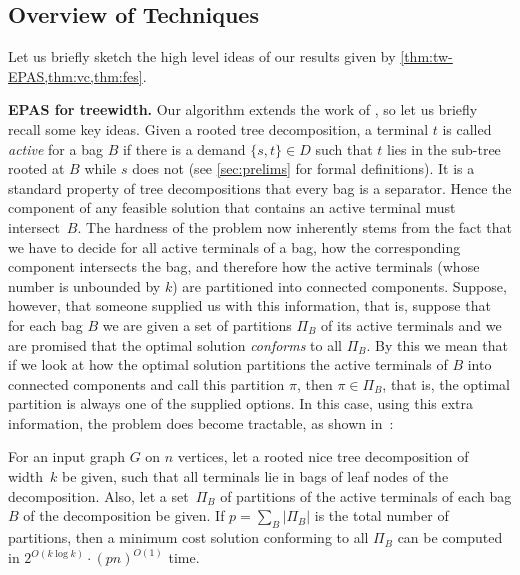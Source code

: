 \subsection{Overview of Techniques}

%
%
%
%
Let us briefly sketch the high level ideas of our results given by \cref{thm:tw-EPAS,thm:vc,thm:fes}.

\smallskip
\textbf{EPAS for treewidth.} Our algorithm extends
the work of \cite{bateni2011approximation}, so let us briefly recall some key
ideas. 
Given a rooted tree decomposition, a terminal $t$ is called \emph{active} for a bag $B$
if there is a demand $\{s,t\}\in D$ such that $t$ lies in the sub-tree rooted at $B$
while $s$ does not (see \cref{sec:prelims} for formal definitions). 
It is a standard property of tree decompositions that every bag is a separator.
Hence the
component of any feasible solution that contains an active terminal must intersect~$B$. 
The hardness of the problem now inherently stems from the fact
that we have to decide for all active terminals of a bag, how
the corresponding component intersects the bag, and therefore how the active
terminals (whose number is unbounded by $k$) are partitioned into connected
components.  Suppose, however, that someone supplied us with this information,
that is, suppose that for each bag $B$ we are given a set of partitions $\Pi_B$
of its active terminals and we are promised that the optimal solution
\emph{conforms} to all $\Pi_B$. By this we mean that if we look at how the
optimal solution partitions the active terminals of $B$ into connected
components and call this partition $\pi$, then $\pi\in \Pi_B$, that is, the
optimal partition is always one of the supplied options. In this case, using
this extra information, the problem does become tractable, as shown in~\cite{bateni2011approximation}:

\begin{theorem}\label{thm:tw-dp} For an input
graph $G$ on $n$ vertices, let a rooted nice tree decomposition of width~$k$ be
given, such that all terminals lie in bags of leaf nodes of the decomposition.
Also, let a set~$\Pi_B$ of partitions of the active terminals of each bag $B$ of
the decomposition be given. If $p=\sum_B |\Pi_B|$ is the total number of
partitions, then a minimum cost \SF solution conforming to all $\Pi_B$ can be
computed in $2^{O(k\log k)}\cdot(pn)^{O(1)}$ time.  
\end{theorem}

